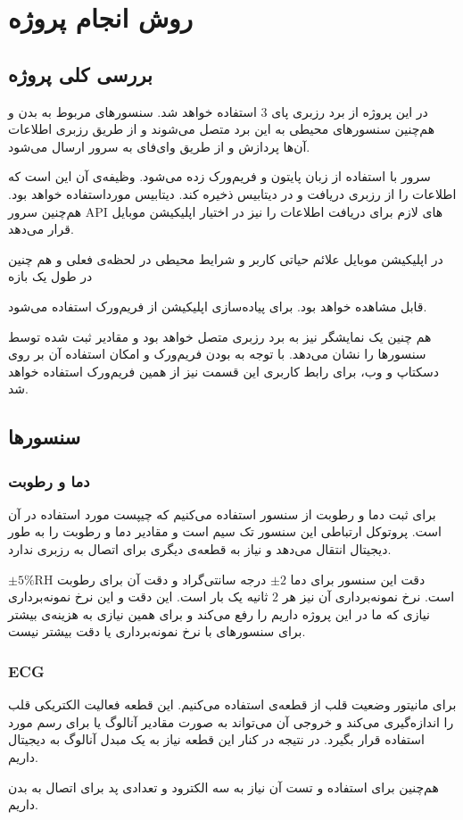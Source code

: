 \documentclass[12pt]{article}
\begin{document}
\newpage
\section{روش انجام پروژه}

\subsection{بررسی کلی پروژه}
در این پروژه از برد رزبری پای $3$ استفاده خواهد شد. سنسورهای مربوط به بدن و هم‌چنین سنسورهای محیطی به این برد متصل می‌شوند و از طریق رزبری اطلاعات آن‌ها پردازش و از طریق وای‌فای به سرور ارسال می‌شود. 

سرور با استفاده از زبان پایتون و فریم‌ورک  زده می‌شود. وظیفه‌ی آن این است که اطلاعات را از رزبری دریافت و در دیتابیس ذخیره کند. دیتابیس مورداستفاده  خواهد بود. هم‌چنین سرور API های لازم برای دریافت اطلاعات را نیز در اختیار اپلیکیشن موبایل قرار می‌دهد.

در اپلیکیشن موبایل علائم حیاتی کاربر و شرایط محیطی در لحظه‌ی فعلی و هم چنین در طول یک بازه 

قابل مشاهده خواهد بود. برای پیاده‌سازی اپلیکیشن از فریم‌ورک  استفاده می‌شود.

هم چنین یک نمایشگر نیز به برد رزبری متصل خواهد بود و مقادیر ثبت شده توسط سنسورها را نشان می‌دهد. با توجه به  بودن فریم‌ورک 
و امکان استفاده آن بر روی دسکتاپ و وب، برای رابط کاربری این قسمت نیز از همین فریم‌ورک استفاده خواهد شد.


\subsection{سنسورها}

\subsubsection{دما و رطوبت}
برای ثبت دما و رطوبت از سنسور  استفاده می‌کنیم که چیپست مورد استفاده در آن  است. پروتوکل ارتباطی این سنسور تک سیم است و مقادیر دما و رطوبت را به طور دیجیتال انتقال می‌دهد و نیاز به قطعه‌‌ی دیگری برای اتصال به رزبری ندارد. 

دقت این سنسور برای دما $\pm2$ درجه سانتی‌گراد و دقت آن برای رطوبت $\pm 5\% \text{RH}$ است. نرخ نمونه‌برداری آن نیز هر $2$ ثانیه یک بار است. این دقت و این نرخ نمونه‌برداری نیازی که ما در این پروژه داریم را رفع می‌کند و برای همین نیازی به هزینه‌ی بیشتر برای سنسورهای با نرخ نمونه‌برداری یا دقت بیشتر نیست.




\subsubsection{ECG}

برای مانیتور وضعیت قلب از قطعه‌ی  استفاده می‌کنیم. این قطعه فعالیت الکتریکی قلب را اندازه‌گیری می‌کند و خروجی آن می‌تواند به صورت مقادیر آنالوگ یا برای رسم  مورد استفاده قرار بگیرد. در نتیجه در کنار این قطعه نیاز به یک مبدل آنالوگ به دیجیتال داریم. 

هم‌چنین برای استفاده و تست آن نیاز به سه الکترود و تعدادی پد برای اتصال به بدن داریم.
\end{document}
